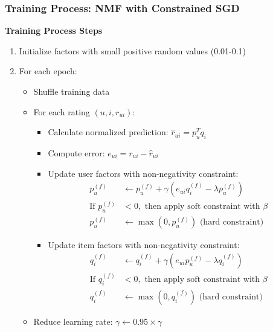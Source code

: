 \documentclass{beamer}
\begin{document}
\begin{frame}
\frametitle{Training Process: NMF with Constrained SGD}
\textbf{Training Process Steps}
\begin{enumerate}
    \item Initialize factors with small positive random values (0.01-0.1)
    \item For each epoch:
    \begin{itemize}
        \item Shuffle training data
        \item For each rating $(u,i,r_{ui})$:
        \begin{itemize}
            \item Calculate normalized prediction: $\hat{r}_{ui} = p_u^T q_i$
            \item Compute error: $e_{ui} = r_{ui} - \hat{r}_{ui}$
            \item Update user factors with non-negativity constraint:
            \begin{align*}
            p_u^{(f)} &\leftarrow p_u^{(f)} + \gamma(e_{ui}q_i^{(f)} - \lambda p_u^{(f)})\\
            \text{If }p_u^{(f)} &< 0, \text{ then apply soft constraint with } \beta\\
            p_u^{(f)} &\leftarrow \max(0, p_u^{(f)}) \text{ (hard constraint)}
            \end{align*}
            \item Update item factors with non-negativity constraint:
            \begin{align*}
            q_i^{(f)} &\leftarrow q_i^{(f)} + \gamma(e_{ui}p_u^{(f)} - \lambda q_i^{(f)})\\
            \text{If }q_i^{(f)} &< 0, \text{ then apply soft constraint with } \beta\\
            q_i^{(f)} &\leftarrow \max(0, q_i^{(f)}) \text{ (hard constraint)}
            \end{align*}
        \end{itemize}
        \item Reduce learning rate: $\gamma \leftarrow 0.95 \times \gamma$
    \end{itemize}
\end{enumerate}
\end{frame}
\end{document}
